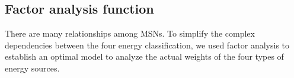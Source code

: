 \documentclass[a4paper,11pt]{article}
\begin{document}




\subsection{Factor analysis function}

\par There are many relationships among MSNs. To simplify the complex dependencies between the four energy classification, we used factor analysis to establish an optimal model to analyze the actual weights of the four types of energy sources.

\end{document}
